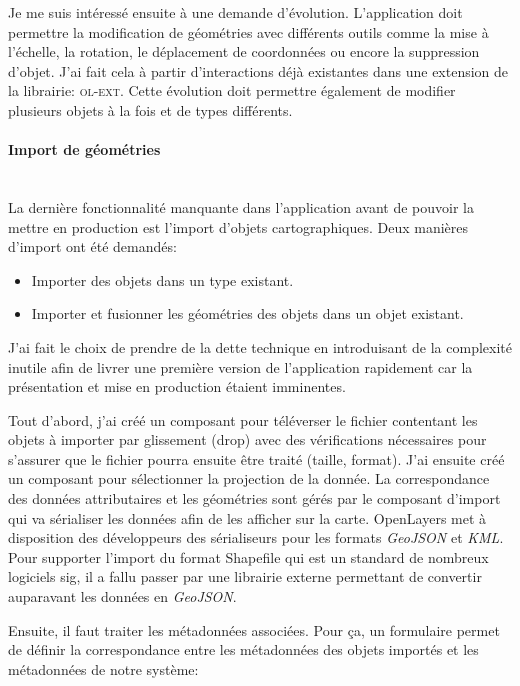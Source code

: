 \documentclass{rapportUHA40}
\begin{document}
Je me suis intéressé ensuite à une demande d'évolution. L'application doit
permettre la modification de géométries avec différents outils comme la mise à
l'échelle, la rotation, le déplacement de coordonnées ou encore la suppression
d'objet. J'ai fait cela à partir d'interactions déjà existantes dans une
extension de la librairie: \textsc{ol-ext}. Cette évolution doit permettre
également de modifier plusieurs objets à la fois et de types différents.

\paragraph{Import de géométries}\mbox{}\\
La dernière fonctionnalité manquante dans l'application avant de pouvoir la
mettre en production est l'import d'objets cartographiques. Deux manières d'import
ont été demandés:
\begin{itemize}
  \item Importer des objets dans un type existant.
  \item Importer et fusionner les géométries des objets dans un objet existant.
\end{itemize}

J'ai fait le choix de prendre de la dette technique en introduisant de la
complexité inutile afin de livrer une première version de l'application
rapidement car la présentation et mise en production étaient imminentes.

Tout d'abord, j'ai créé un composant pour téléverser le fichier contentant les
objets à importer par glissement (drop) avec des vérifications nécessaires pour
s'assurer que le fichier pourra ensuite être traité (taille, format). J'ai
ensuite créé un composant pour sélectionner la projection de la donnée. La
correspondance des données attributaires et les géométries sont gérés par le
composant d'import qui va sérialiser les données afin de les afficher sur la
carte. OpenLayers met à disposition des développeurs des sérialiseurs pour les
formats \textit{GeoJSON} et \textit{KML}. Pour supporter l'import du format
Shapefile qui est un standard de nombreux logiciels \gls{sig}, il a fallu
passer par une librairie externe permettant de convertir auparavant les données
en \textit{GeoJSON}.

Ensuite, il faut traiter les métadonnées associées. Pour ça, un formulaire
permet de définir la correspondance entre les métadonnées des objets importés
et les métadonnées de notre système:
\end{document}
